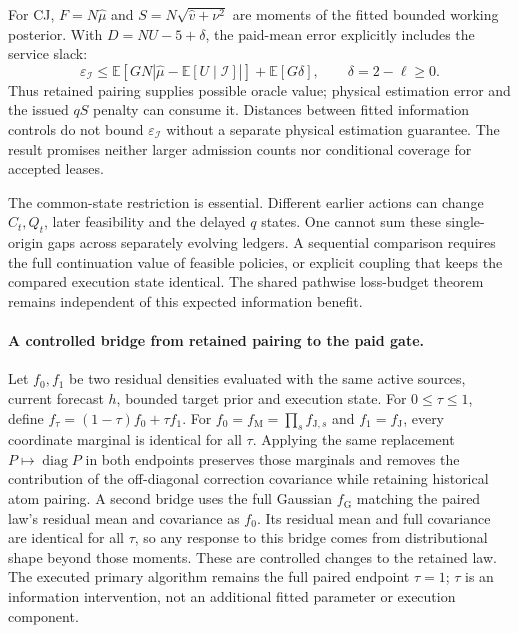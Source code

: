 \documentclass[10pt]{article}
\begin{document}
For CJ, $F=N\widehat\mu$ and
$S=N\sqrt{\widehat v+\nu^2}$ are moments of the fitted bounded working
posterior.  With $D=NU-5+\delta$, the paid-mean error explicitly includes
the service slack:
\begin{equation}
 \varepsilon_{\mathcal I}
 \leq\mathbb E\!\left[GN
     |\widehat\mu-\mathbb E[U\mid\mathcal I]|\right]
     +\mathbb E[G\delta],\qquad \delta=2-\ell\geq0.
 \label{eq:final-paid-target-error}
\end{equation}
Thus retained pairing supplies possible oracle value; physical estimation
error and the issued $qS$ penalty can consume it.  Distances between fitted
information controls do not bound $\varepsilon_{\mathcal I}$ without a
separate physical estimation guarantee.  The result promises neither
larger admission counts nor conditional coverage for accepted leases.

The common-state restriction is essential.  Different earlier actions can
change $C_t,Q_t$, later feasibility and the delayed $q$ states.  One cannot
sum these single-origin gaps across separately evolving ledgers.  A
sequential comparison requires the full continuation value of feasible
policies, or explicit coupling that keeps the compared execution state
identical.  The shared pathwise loss-budget theorem remains independent of
this expected information benefit.

\paragraph{A controlled bridge from retained pairing to the paid gate.}
Let $f_0,f_1$ be two residual densities evaluated with the same active
sources, current forecast $h$, bounded target prior and execution state.
For $0\leq\tau\leq1$, define $f_\tau=(1-\tau)f_0+\tau f_1$.
For $f_0=f_{\mathrm M}=\prod_s f_{\mathrm J,s}$ and
$f_1=f_{\mathrm J}$, every coordinate marginal is identical for all $\tau$.
Applying the same replacement $P\mapsto\operatorname{diag}P$ in both
endpoints preserves those marginals and removes the contribution of the
off-diagonal correction covariance while retaining historical atom pairing.
A second bridge uses the full Gaussian $f_{\mathrm G}$ matching the paired
law's residual mean and covariance as $f_0$.  Its residual mean and full
covariance are identical for all $\tau$, so any response to this bridge
comes from distributional shape beyond those moments.  These are controlled
changes to the retained law. The executed primary algorithm remains the
full paired endpoint $\tau=1$; $\tau$ is an information intervention,
not an additional fitted parameter or execution component.
\end{document}
